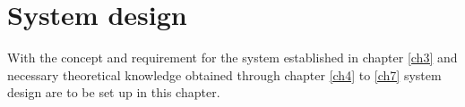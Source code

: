 \chapter{System design} \label{ch8}
With the concept and requirement for the system established in chapter \ref{ch3} and necessary theoretical knowledge obtained through chapter \ref{ch4} to \ref{ch7} system design are to be set up in this chapter.

\section{}    

%